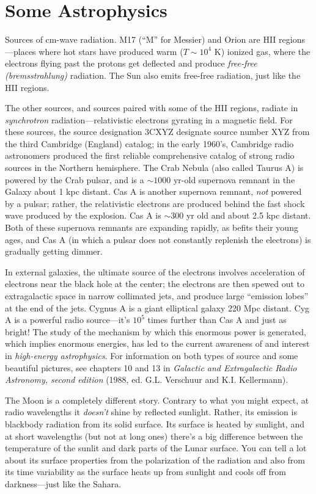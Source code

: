 \documentclass[11pt,preprint]{aastex}
\begin{document}
\section{Some Astrophysics}

\noindent
Sources of cm-wave radiation.  M17 (``M'' for Messier) and Orion
are HII regions---places where hot stars have produced warm ($T \sim
10^4$ K) ionized gas, where the electrons flying past the protons get
deflected and produce {\it free-free (bremsstrahlung)} radiation.  The
Sun also emits free-free radiation, just like the HII regions.

The other sources, and sources paired with some of the HII regions,
radiate in {\it synchrotron} radiation---relativistic electrons gyrating
in a magnetic field.  For these sources, the source designation 3CXYZ
designate source number XYZ from the third Cambridge (England) catalog;
in the early 1960's, Cambridge radio astronomers produced the first
reliable comprehensive catalog of strong radio sources in the Northern
hemisphere.  The Crab Nebula (also called Taurus A) is powered by the
Crab pulsar, and is a $\sim 1000$ yr-old supernova remnant in the Galaxy
about 1 kpc distant. Cas A is another supernova remnant, {\it not}
powered by a pulsar; rather, the relativistic electrons are produced
behind the fast shock wave produced by the explosion.  Cas A is $\sim
300$ yr old and about 2.5 kpc distant.  Both of these supernova remnants
are expanding rapidly, as befits their young ages, and Cas A (in which a
pulsar does not constantly replenish the electrons) is gradually getting
dimmer.

In external galaxies, the ultimate source of the
electrons involves acceleration of electrons near the black hole at the
center; the electrons are then spewed out to extragalactic space in
narrow collimated jets, and produce large ``emission lobes'' at the end
of the jets.  Cygnus A is a giant
elliptical galaxy 220 Mpc distant.  Cyg A is a powerful radio
source---it's $10^5$ times further than Cas A and just as bright! The
study of the mechanism by which this enormous power is generated, which
implies enormous energies, has led to the current awareness of and
interest in {\it high-energy astrophysics}.
For information on both types of source and some beautiful
pictures, see chapters 10 and 13 in {\it Galactic and Extragalactic
Radio Astronomy, second edition} (1988, ed.  G.L.  Verschuur and K.I. 
Kellermann). 

	The Moon is a completely different story. Contrary to what you
might expect, at radio wavelengths it {\it doesn't} shine by reflected
sunlight. Rather, its emission is blackbody radiation from its solid
surface. Its surface is heated by sunlight, and at short wavelengths
(but not at long ones) there's a big difference between the temperature
of the sunlit and dark parts of the Lunar surface. You can tell a lot
about its surface properties from the polarization of the radiation and
also from its time variability as the surface heats up from sunlight and
cools off from darkness---just like the Sahara.
\end{document}
